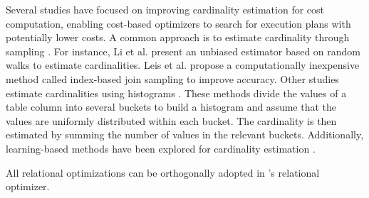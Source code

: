 Several studies have focused on improving cardinality estimation for cost computation, enabling cost-based optimizers to search for execution plans with potentially lower costs. A common approach is to estimate cardinality through sampling \cite{index-based-join-sampling,ripple-join,wanderjoin,index-based-join-sampling}. For instance, Li et al.\cite{wanderjoin} present an unbiased estimator based on random walks to estimate cardinalities. Leis et al.\cite{index-based-join-sampling} propose a computationally inexpensive method called index-based join sampling to improve accuracy. Other studies estimate cardinalities using histograms \cite{histogram,postgres-row-estimation}. These methods divide the values of a table column into several buckets to build a histogram and assume that the values are uniformly distributed within each bucket. The cardinality is then estimated by summing the number of values in the relevant buckets. Additionally, learning-based methods have been explored for cardinality estimation \cite{learning-based-estimation-1,learning-based-estimation-2,learning-based-estimation-3,learning-based-estimation-4}.

All relational optimizations can be orthogonally adopted in \name's relational optimizer.


